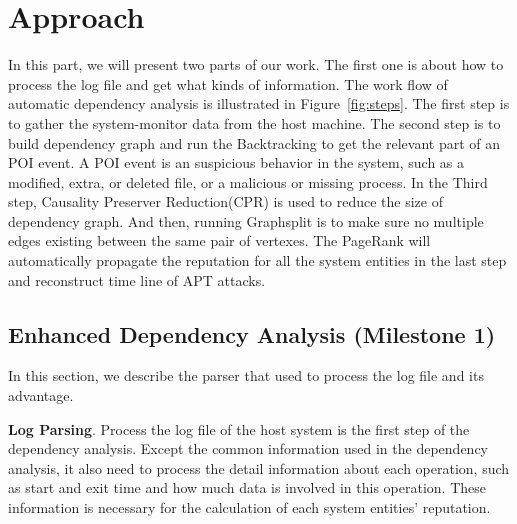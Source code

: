 \section{Approach}
In this part, we will present two parts of our work. The first one is about how to process the log file and get what kinds of information. The work flow of automatic dependency analysis is illustrated in Figure~\ref{fig:steps}. The first step is to gather the system-monitor data from the host machine. The second step is to build dependency graph and run the Backtracking to get the relevant part of an POI event\cite{xu2016high}. A POI event is an suspicious behavior in the system, such as a modified, extra, or deleted file, or a malicious or missing process. In the Third step, 
Causality Preserver Reduction(CPR)  is used to reduce the size of dependency graph. And then, running Graphsplit is to make sure no multiple edges existing between the same pair of vertexes. The PageRank will automatically propagate the reputation for all the system entities in the last step and reconstruct time line of APT attacks.


\subsection{Enhanced Dependency Analysis (Milestone 1)}
In this section, we describe the parser that used to process the log file and its advantage.

\textbf{Log Parsing}.
Process the log file of the host system is the first step of the dependency analysis. Except the common information used in the dependency analysis, it also need to process the detail information about each operation, such as start and exit time and how much data is involved in this operation. These information is necessary for the calculation of each system entities' reputation.

